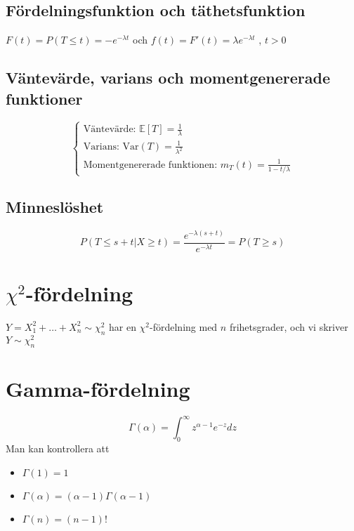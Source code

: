 \subsection{Fördelningsfunktion och täthetsfunktion}
$F(t)=P(T\leq t)=-e^{-\lambda t}$ och $f(t)=F'(t)=\lambda e^{-\lambda t}$ , $t>0$
\subsection{Väntevärde, varians och momentgenererade funktioner}
$$
	\begin{cases}
		\text{Väntevärde: }\mathbb{E}[T]=\frac{1}{\lambda} \\
		\text{Varians: }\text{Var}(T)=\frac{1}{\lambda^2}  \\
		\text{Momentgenererade funktionen: } m_T(t)=\frac{1}{1-t/\lambda}
	\end{cases}
$$
\subsection{Minneslöshet}
$$
	P(T\leq s+t | X\geq t)=\frac{e^{-\lambda(s+t)}}{e^{-\lambda t}}=P(T\geq s)
$$

\section{$\chi^2$-fördelning}
$Y=X^2_1+\ldots+X^2_n\sim\chi^2_n$ har en $\chi^2$-fördelning med $n$ frihetsgrader, och vi skriver $Y\sim\chi^2_n$
\section{Gamma-fördelning}
$$\Gamma(\alpha)=\int_0^\infty z^{\alpha-1}e^{-z}dz$$
Man kan kontrollera att \begin{itemize}
	\item $\Gamma(1)=1$
	\item $\Gamma(\alpha)=(\alpha-1)\Gamma(\alpha-1)$
	\item $\Gamma(n)=(n-1)!$
\end{itemize}
